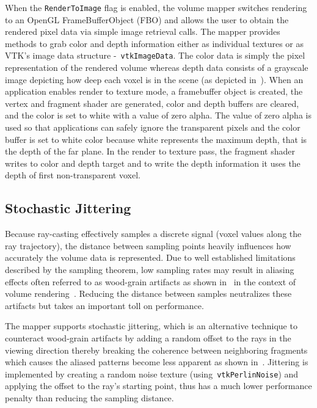 When the \texttt{RenderToImage} flag is enabled, the volume mapper switches
rendering to an OpenGL FrameBufferObject (FBO) and allows the user to obtain the
rendered pixel data via simple image retrieval calls. The mapper provides
methods to grab color and depth information either as individual textures or as
VTK's image data structure -~\texttt{vtkImageData}. The color data is simply the
pixel representation of the rendered volume whereas depth data consists of a
grayscale image depicting how deep each voxel is in the scene (as depicted
in~). When an application enables render to texture
mode, a framebuffer object is created, the vertex and fragment shader are
generated, color and depth buffers are cleared, and the color is set to white
with a value of zero alpha. The value of zero alpha is used so that applications
can safely ignore the transparent pixels and the color buffer is set to white
color because white represents the maximum depth, that is the depth of the far
plane. In the render to texture pass, the fragment shader writes to color and
depth target and to write the depth information it uses the depth of first
non-transparent voxel.

\subsection{Stochastic Jittering}
\label{jittering}
Because ray-casting effectively samples a discrete signal (voxel values along
the ray trajectory), the distance between sampling points heavily influences how
accurately the volume data is represented.  Due to well established limitations
described by the sampling theorem, low sampling rates may result in aliasing
effects often referred to as wood-grain artifacts as shown
in~ in the context of volume
rendering~\citep{engel_real-time_2006}. Reducing the distance between samples
neutralizes these artifacts but takes an important toll on performance.

The mapper supports stochastic jittering, which is an alternative technique to
counteract wood-grain artifacts by adding a random offset to the rays in the
viewing direction thereby breaking the coherence between neighboring fragments
which causes the aliased patterns become less apparent as shown
in~.  Jittering is implemented by creating a random
noise texture (using~\texttt{vtkPerlinNoise}) and applying the offset to the
ray's starting point, thus has a much lower performance penalty than reducing
the sampling distance.

